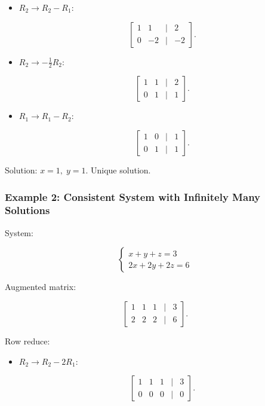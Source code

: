 \documentclass[
  letterpaper,
  DIV=11,
  numbers=noendperiod]{scrreprt}
\begin{document}
\begin{itemize}
\item
  \(R_2 \to R_2 - R_1\):

  \[
  \begin{bmatrix}  
  1 & 1 & | & 2 \\  
  0 & -2 & | & -2  
  \end{bmatrix}.
  \]
\item
  \(R_2 \to -\tfrac{1}{2}R_2\):

  \[
  \begin{bmatrix}  
  1 & 1 & | & 2 \\  
  0 & 1 & | & 1  
  \end{bmatrix}.
  \]
\item
  \(R_1 \to R_1 - R_2\):

  \[
  \begin{bmatrix}  
  1 & 0 & | & 1 \\  
  0 & 1 & | & 1  
  \end{bmatrix}.
  \]
\end{itemize}

Solution: \(x = 1, \; y = 1\). Unique solution.

\subsubsection{Example 2: Consistent System with Infinitely Many
Solutions}\label{example-2-consistent-system-with-infinitely-many-solutions}

System:

\[
\begin{cases}  
x + y + z = 3 \\  
2x + 2y + 2z = 6  
\end{cases}
\]

Augmented matrix:

\[
\begin{bmatrix}  
1 & 1 & 1 & | & 3 \\  
2 & 2 & 2 & | & 6  
\end{bmatrix}.
\]

Row reduce:

\begin{itemize}
\item
  \(R_2 \to R_2 - 2R_1\):

  \[
  \begin{bmatrix}  
  1 & 1 & 1 & | & 3 \\  
  0 & 0 & 0 & | & 0  
  \end{bmatrix}.
  \]
\end{itemize}
\end{document}
